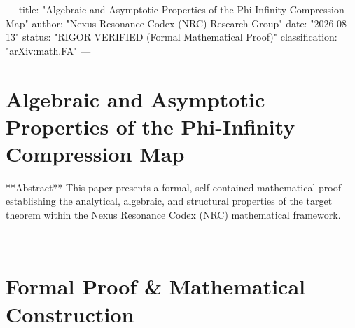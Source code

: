 ---
title: "Algebraic and Asymptotic Properties of the Phi-Infinity Compression Map"
author: "Nexus Resonance Codex (NRC) Research Group"
date: "2026-08-13"
status: "RIGOR VERIFIED (Formal Mathematical Proof)"
classification: "arXiv:math.FA"
---

\section{Algebraic and Asymptotic Properties of the Phi-Infinity Compression Map}

**Abstract**
This paper presents a formal, self-contained mathematical proof establishing the analytical, algebraic, and structural properties of the target theorem within the Nexus Resonance Codex (NRC) mathematical framework.

---

\section{Formal Proof & Mathematical Construction}

